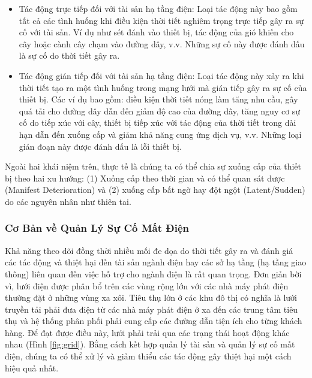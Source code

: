 \documentclass[utf8]{frontiersSCNS} %
\begin{document}
\begin{itemize}
\item Tác động trực tiếp đối với tài sản hạ tầng điện: Loại tác động này bao gồm tất cả các tình huống khi điều kiện thời tiết nghiêm trọng trực tiếp gây ra sự cố với tài sản. Ví dụ như sét đánh vào thiết bị, tác động của gió khiến cho cây hoặc cành cây chạm vào đường dây, v.v. Những sự cố này được đánh dấu là sự cố do thời tiết gây ra.

\item Tác động gián tiếp đối với tài sản hạ tầng điện: Loại tác động này xảy ra khi thời tiết tạo ra một tình huống trong mạng lưới mà gián tiếp gây ra sự cố của thiết bị. Các ví dụ bao gồm: điều kiện thời tiết nóng làm tăng nhu cầu, gây quá tải cho đường dây dẫn đến giảm độ cao của đường dây, tăng nguy cơ sự cố do tiếp xúc với cây, thiết bị tiếp xúc với tác động của thời tiết trong dài hạn dẫn đến xuống cấp và giảm khả năng cung ứng dịch vụ, v.v. Những loại gián đoạn này được đánh dấu là lỗi thiết bị.

\end{itemize}

Ngoài hai khái niệm trên, thực tế là chúng ta có thể chia sự xuống cấp của thiết bị theo hai xu hướng: (1) Xuống cấp theo thời gian và có thể quan sát được (Manifest Deterioration) và (2) xuống cấp bất ngờ hay đột ngột (Latent/Sudden) do các nguyên nhân như thiên tai.

\subsubsection{Cơ Bản về Quản Lý Sự Cố Mất Điện}

Khả năng theo dõi đồng thời nhiều mối đe dọa do thời tiết gây ra và đánh giá các tác động và thiệt hại đến tài sản ngành điện hay các sở hạ tầng (hạ tầng giao thông) liên quan đến việc hỗ trợ cho ngành điện là rất quan trọng. Đơn giản bời vì, lưới điện được phân bổ trên các vùng rộng lớn với các nhà máy phát điện thường đặt ở những vùng xa xôi. Tiêu thụ lớn ở các khu đô thị có nghĩa là lưới truyền tải phải đưa điện từ các nhà máy phát điện ở xa đến các trung tâm tiêu thụ và hệ thống phân phối phải cung cấp các đường dẫn tiện ích cho từng khách hàng. Để đạt được điều này, lưới phải trải qua các trạng thái hoạt động khác nhau (Hình \ref{fig:grid}). Bằng cách kết hợp quản lý tài sản và quản lý sự cố mất điện, chúng ta có thể xử lý và giảm thiểu các tác động gây thiệt hại một cách hiệu quả nhất.
\end{document}
